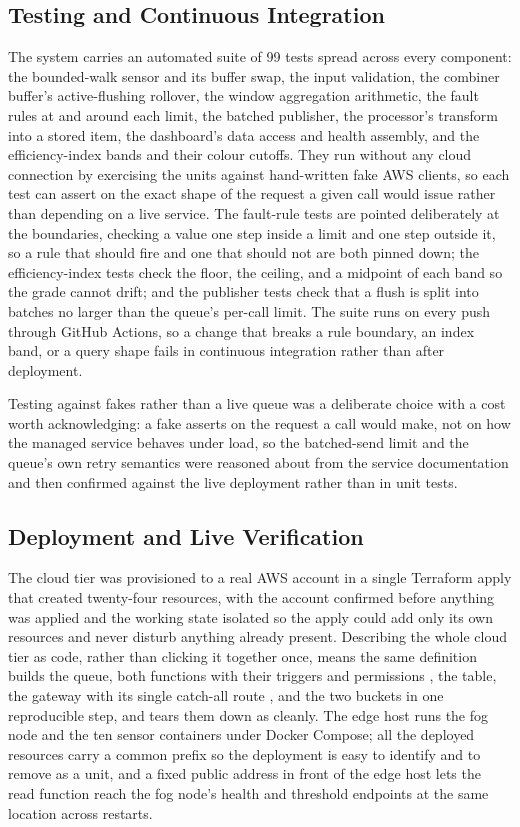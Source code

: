 \documentclass[conference]{IEEEtran}
\begin{document}
\subsection{Testing and Continuous Integration}

The system carries an automated suite of 99 tests spread across every component: the bounded-walk sensor and its buffer swap, the input validation, the combiner buffer's active-flushing rollover, the window aggregation arithmetic, the fault rules at and around each limit, the batched publisher, the processor's transform into a stored item, the dashboard's data access and health assembly, and the efficiency-index bands and their colour cutoffs. They run without any cloud connection by exercising the units against hand-written fake AWS clients, so each test can assert on the exact shape of the request a given call would issue rather than depending on a live service. The fault-rule tests are pointed deliberately at the boundaries, checking a value one step inside a limit and one step outside it, so a rule that should fire and one that should not are both pinned down; the efficiency-index tests check the floor, the ceiling, and a midpoint of each band so the grade cannot drift; and the publisher tests check that a flush is split into batches no larger than the queue's per-call limit. The suite runs on every push through GitHub Actions, so a change that breaks a rule boundary, an index band, or a query shape fails in continuous integration rather than after deployment.

Testing against fakes rather than a live queue was a deliberate choice with a cost worth acknowledging: a fake asserts on the request a call would make, not on how the managed service behaves under load, so the batched-send limit and the queue's own retry semantics were reasoned about from the service documentation \cite{awssqs} and then confirmed against the live deployment rather than in unit tests.

\subsection{Deployment and Live Verification}

The cloud tier was provisioned to a real AWS account in a single Terraform apply that created twenty-four resources, with the account confirmed before anything was applied and the working state isolated so the apply could add only its own resources and never disturb anything already present. Describing the whole cloud tier as code, rather than clicking it together once, means the same definition builds the queue, both functions with their triggers and permissions \cite{awslambda}, the table, the gateway with its single catch-all route \cite{awsapigw}, and the two buckets in one reproducible step, and tears them down as cleanly. The edge host runs the fog node and the ten sensor containers under Docker Compose; all the deployed resources carry a common prefix so the deployment is easy to identify and to remove as a unit, and a fixed public address in front of the edge host lets the read function reach the fog node's health and threshold endpoints at the same location across restarts.
\end{document}

